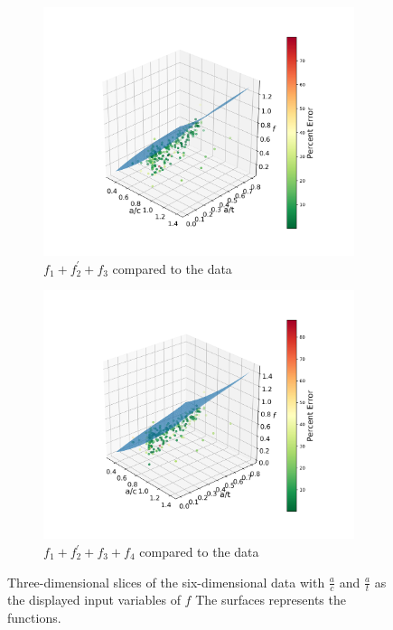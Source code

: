 \begin{figure}[h!]
\begin{subfigure}[b]{0.5\textwidth}
    \includegraphics[width=\textwidth]{f1f2f3_surf.png}
    \caption{$f_1 + f^{'}_{2} + f_3$ compared to the data}
    \label{fig:f3_surf}
  \end{subfigure}
  \hfill
  \begin{subfigure}[b]{0.5\textwidth}
    \includegraphics[width=\textwidth]{f1f2f3f4_surf.png}
    \caption{$f_1 + f^{'}_{2} + f_3 + f_4$ compared to the data}
    \label{fig:f4_surf}
  \end{subfigure}

  \caption{Three-dimensional slices of the six-dimensional data with
$\frac{a}{c}$ and $\frac{a}{t}$ as the displayed input variables of $f$ The
surfaces represents the functions.}

\end{figure}


